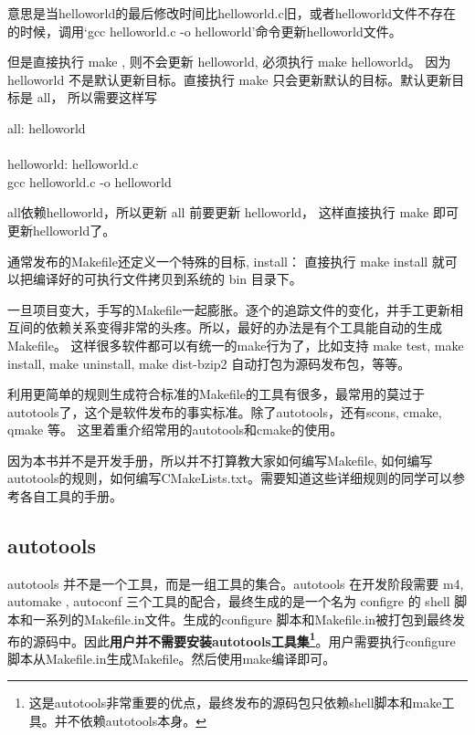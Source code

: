意思是当helloworld的最后修改时间比helloworld.c旧，或者helloworld文件不存在的时候，调用`gcc helloworld.c -o helloworld'命令更新helloworld文件。

\begin{notice}
但是直接执行 make , 则不会更新 helloworld, 必须执行 make helloworld。 因为 helloworld 不是默认更新目标。直接执行 make 只会更新默认的目标。默认更新目标是 all， 所以需要这样写

\begin{code}
all: helloworld
\\
\qquad
\\

helloworld: helloworld.c\\
\qquad gcc helloworld.c -o helloworld
\end{code}

all依赖helloworld，所以更新 all 前要更新 helloworld， 这样直接执行 make 即可更新helloworld了。

\end{notice}

通常发布的Makefile还定义一个特殊的目标,  install： 直接执行 make install 就可以把编译好的可执行文件拷贝到系统的 bin 目录下。

一旦项目变大，手写的Makefile一起膨胀。逐个的追踪文件的变化，并手工更新相互间的依赖关系变得非常的头疼。所以，最好的办法是有个工具能自动的生成Makefile。
这样很多软件都可以有统一的make行为了，比如支持 make test,  make install, make uninstall, make dist-bzip2 自动打包为源码发布包，等等。

利用更简单的规则生成符合标准的Makefile的工具有很多，最常用的莫过于autotools了，这个是软件发布的事实标准。除了autotools，还有scons, cmake, qmake 等。
这里着重介绍常用的autotools和cmake的使用。

因为本书并不是开发手册，所以并不打算教大家如何编写Makefile, 如何编写autotools的规则，如何编写CMakeLists.txt。需要知道这些详细规则的同学可以参考各自工具的手册。

\subsection{autotools}

autotools 并不是一个工具，而是一组工具的集合。autotools 在开发阶段需要 m4, automake , autoconf 三个工具的配合，最终生成的是一个名为 configre 的 shell 脚本和一系列的Makefile.in文件。生成的configure 脚本和Makefile.in被打包到最终发布的源码中。因此\textbf{用户并不需要安装autotools工具集\footnote{这是autotools非常重要的优点，最终发布的源码包只依赖shell脚本和make工具。并不依赖autotools本身。}}。用户需要执行configure脚本从Makefile.in生成Makefile。然后使用make编译即可。

